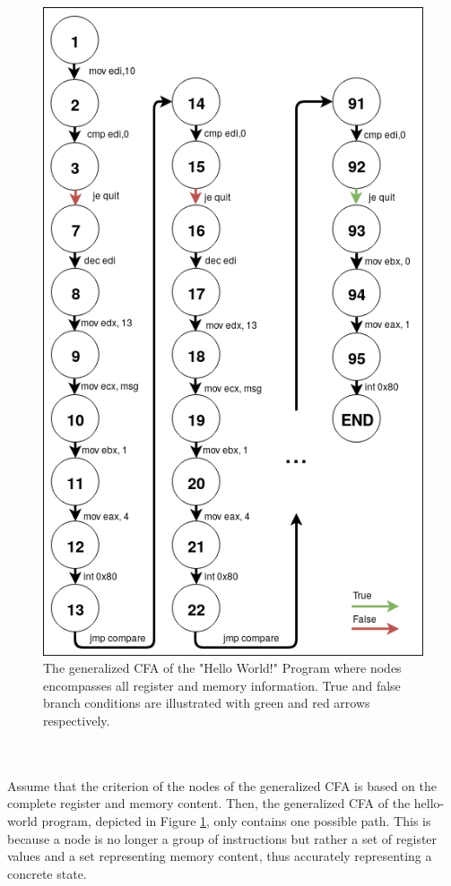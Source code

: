\documentclass{kththesis}
\begin{document}
\noindent
\begin{figure}[th]
    \centering
    \includegraphics[scale=0.4]{Images/CFA.png}
    \caption[The generalized CFA of the "Hello World!" Program where nodes encompasses all register and memory information.]{The generalized CFA of the "Hello World!" Program where nodes encompasses all register and memory information. True and false branch conditions are illustrated with green and red arrows respectively.}
    \label{fig:HelloCFA}
\end{figure}
\noindent
\\ \\
Assume that the criterion of the nodes of the generalized CFA is based on the complete register and memory content. Then, the generalized CFA of the hello-world program, depicted in Figure \ref{fig:HelloCFA}, only contains one possible path. This is because a node is no longer a group of instructions but rather a set of register values and a set representing memory content, thus accurately representing a concrete state. 
\end{document}
